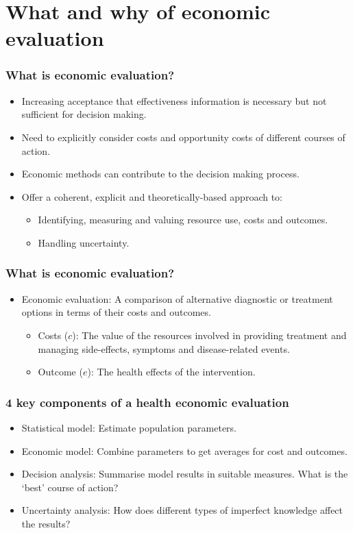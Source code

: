 \section{What and why of economic evaluation}

\begin{frame}
\frametitle{What is economic evaluation?}
	\begin{itemize}
		\item Increasing acceptance that effectiveness information is necessary but not sufficient for decision making.
		\uncover
		\item Need to \alert{explicitly} consider costs and opportunity costs of different courses of action.
		\item Economic methods can contribute to the decision making process.
		\item Offer a \alert{coherent, explicit and theoretically-based} approach to:
		\begin{itemize}
			\item Identifying, measuring and valuing resource use, costs and
outcomes.
			\item Handling uncertainty.
		\end{itemize}
	\end{itemize}
\end{frame}


\begin{frame}
\frametitle{What is economic evaluation?}
	\begin{itemize}
	\item Economic evaluation: A comparison of alternative diagnostic or treatment options in terms of their \alert{costs} and \alert{outcomes}.

		\begin{itemize}
			\item \alert{Costs ($c$)}: The value of the resources involved in providing treatment and managing side-effects, symptoms and disease-related events.
			\item \alert{Outcome ($e$)}: The health effects of the intervention.
		\end{itemize}
	\end{itemize}
\end{frame}

\begin{frame}
\frametitle{4 key components of a health economic evaluation}
\begin{itemize}
	\pause
	\item \alert{Statistical model}: Estimate population parameters.
	\pause
	\item \alert{Economic model}: Combine parameters to get averages for cost and outcomes.
	\pause
	\item \alert{Decision analysis}: Summarise model results in suitable measures. What is the `best' course of action?
	\pause
	\item \alert{Uncertainty analysis}: How does different types of imperfect knowledge affect the results?
\end{itemize}
\end{frame}


